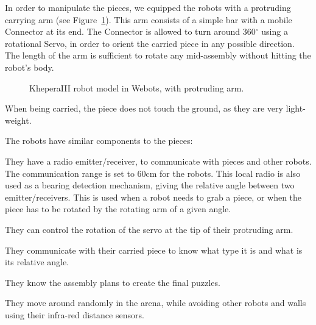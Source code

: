	In order to manipulate the pieces, we equipped the robots with a protruding carrying arm (see Figure~\ref{fig:robot_overview}). This arm consists of a simple bar with a mobile Connector at its end. The Connector is allowed to turn around 360$^{\circ}$ using a rotational Servo, in order to orient the carried piece in any possible direction. The length of the arm is sufficient to rotate any mid-assembly without hitting the robot's body.

	\begin{figure}[h!]
		\centering
		\; %
		\caption{KheperaIII robot model in Webots, with protruding arm.}
	\label{fig:robot_overview} %
	\end{figure}
	

	When being carried, the piece does not touch the ground, as they are very light-weight.
	
	The robots have similar components to the pieces:
	\begin{my_itemize}
		\item They have a radio emitter/receiver, to communicate with pieces and other robots. The communication range is set to 60cm for the robots. This local radio is also used as a bearing detection mechanism, giving the relative angle between two emitter/receivers. This is used when a robot needs to grab a piece, or when the piece has to be rotated by the rotating arm of a given angle.
		\item They can control the rotation of the servo at the tip of their protruding arm.
		\item They communicate with their carried piece to know what type it is and what is its relative angle.
		\item They know the assembly plans to create the final puzzles.
		\item They move around randomly in the arena, while avoiding other robots and walls using their infra-red distance sensors.
	\end{my_itemize}
	
